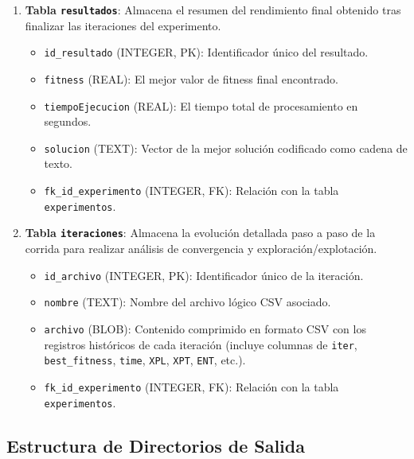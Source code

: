 \begin{enumerate}
    \item \textbf{Tabla \texttt{resultados}}:
    Almacena el resumen del rendimiento final obtenido tras finalizar las iteraciones del experimento.
    \begin{itemize}
        \item \texttt{id\_resultado} (INTEGER, PK): Identificador único del resultado.
        \item \texttt{fitness} (REAL): El mejor valor de fitness final encontrado.
        \item \texttt{tiempoEjecucion} (REAL): El tiempo total de procesamiento en segundos.
        \item \texttt{solucion} (TEXT): Vector de la mejor solución codificado como cadena de texto.
        \item \texttt{fk\_id\_experimento} (INTEGER, FK): Relación con la tabla \texttt{experimentos}.
    \end{itemize}

    \item \textbf{Tabla \texttt{iteraciones}}:
    Almacena la evolución detallada paso a paso de la corrida para realizar análisis de convergencia y exploración/explotación.
    \begin{itemize}
        \item \texttt{id\_archivo} (INTEGER, PK): Identificador único de la iteración.
        \item \texttt{nombre} (TEXT): Nombre del archivo lógico CSV asociado.
        \item \texttt{archivo} (BLOB): Contenido comprimido en formato CSV con los registros históricos de cada iteración (incluye columnas de \texttt{iter}, \texttt{best\_fitness}, \texttt{time}, \texttt{XPL}, \texttt{XPT}, \texttt{ENT}, etc.).
        \item \texttt{fk\_id\_experimento} (INTEGER, FK): Relación con la tabla \texttt{experimentos}.
    \end{itemize}
\end{enumerate}

\subsection{Estructura de Directorios de Salida}

